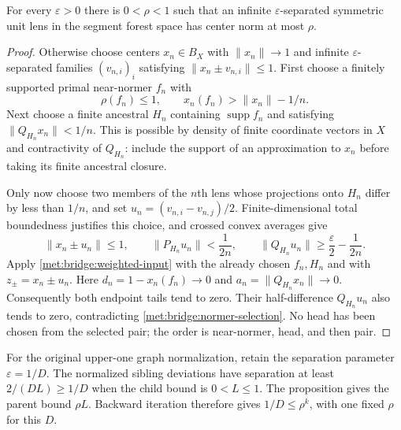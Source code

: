 \begin{proposition}\label{met:bridge:normer-first}
For every $\varepsilon>0$ there is $0<\rho<1$ such that an infinite
$\varepsilon$-separated symmetric unit lens in the segment forest
space has center norm at most $\rho$.
\end{proposition}
\begin{proof}
Otherwise choose centers $x_n\in B_X$ with $\|x_n\|\to1$ and
infinite $\varepsilon$-separated families $(v_{n,i})_i$ satisfying
$\|x_n\pm v_{n,i}\|\le1$. First choose a finitely supported primal
near-normer $f_n$ with
\[
 \rho(f_n)\le1,\qquad x_n(f_n)>\|x_n\|-1/n.
\]
Next choose a finite ancestral $H_n$ containing
$\operatorname{supp}f_n$ and satisfying $\|Q_{H_n}x_n\|<1/n$.
This is possible by density of finite coordinate vectors in $X$ and
contractivity of $Q_{H_n}$: include the support of an approximation
to $x_n$ before taking its finite ancestral closure.

Only now choose two members of the $n$th lens whose projections
onto $H_n$ differ by less than $1/n$, and set
$u_n=(v_{n,i}-v_{n,j})/2$. Finite-dimensional total boundedness
justifies this choice, and crossed convex averages give
\begin{equation}\label{met:bridge:normer-selection}
 \|x_n\pm u_n\|\le1,\qquad
 \|P_{H_n}u_n\|<\frac1{2n},\qquad
 \|Q_{H_n}u_n\|\ge\frac\varepsilon2-\frac1{2n}.
\end{equation}
Apply \eqref{met:bridge:weighted-input} with the already chosen
$f_n,H_n$ and with $z_\pm=x_n\pm u_n$. Here
$d_n=1-x_n(f_n)\to0$ and $a_n=\|Q_{H_n}x_n\|\to0$.
Consequently both endpoint tails tend to zero. Their half-difference
$Q_{H_n}u_n$ also tends to zero, contradicting
\eqref{met:bridge:normer-selection}. No head has been chosen from
the selected pair; the order is near-normer, head, and then pair.
\end{proof}

For the original upper-one graph normalization, retain the separation
parameter $\varepsilon=1/D$. The normalized sibling deviations have
separation at least $2/(DL)\ge1/D$ when the child bound is
$0<L\le1$. The proposition gives the parent bound $\rho L$.
Backward iteration therefore gives $1/D\le\rho^k$, with one fixed
$\rho$ for this $D$.
